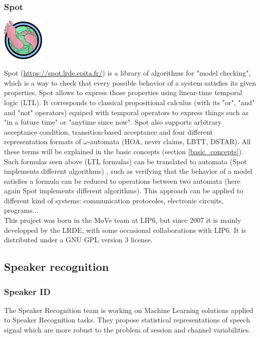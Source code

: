 \subsubsection{Spot}
\begin{center}
 \includegraphics[width=2cm]{img/spot.png}
\end{center}
Spot (\url{https://spot.lrde.epita.fr/}) is a library of algorithms for "model checking",
which is a way to check that every possible behavior of a system satisfies its given properties.
Spot allows to express those properties using linear-time temporal logic (LTL). It corresponds to classical
propositional calculus (with its "or", "and" and "not" operators) equiped with temporal operators to
express things such as "in a future time" or "anytime since now". Spot also supports arbitrary
acceptance condition, transition-based acceptance and four different representation formats of
$\omega$-automata (HOA, never claims, LBTT, DSTAR). All these terms will be explained in the basic
concepts (section \ref{basic_concepts}).\\

Such formulas seen above (LTL formulas) can be translated to automata (Spot implements different algorithms)
, such as verifying that the behavior of a model satisfies a formula can be reduced to operations between
two automata (here again Spot implements different algorithms). This approach can be applied to different kind of systems: communication protocoles,
electronic circuits, programs...\\

This project was born in the MoVe team at LIP6, but since 2007 it is mainly developped by the LRDE, with some
occasional collaborations with LIP6. It is distributed under a GNU GPL version 3 license.


\subsection{Speaker recognition}
\subsubsection{Speaker ID}
The Speaker Recognition team is working on Machine Learning solutions applied to Speaker Recognition
tasks. They propose statistical representations of speech signal which are more robust to the problem
of session and channel variabilities.\\

